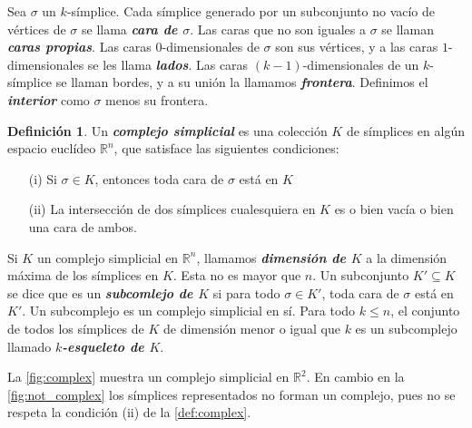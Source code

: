 \documentclass[10pt]{report}
\newcommand{\R}{\mathbb{R}}
\newcommand{\enfatiza}[1]{\textbf{\textit{#1}}}
\theoremstyle{definition}
\newtheorem{defin}{Definición}[section]
\begin{document}
Sea $\sigma$ un $k$-símplice. Cada símplice generado por un subconjunto no vacío de vértices de $\sigma$ se llama \enfatiza{cara de $\sigma$}. Las caras que no son iguales a $\sigma$ se llaman \enfatiza{caras propias}. Las caras $0$-dimensionales de $\sigma$ son sus vértices, y a las caras $1$-dimensionales se les llama \enfatiza{lados}. Las caras $(k-1)$-dimensionales de un $k$-símplice se llaman bordes, y a su unión la llamamos \enfatiza{frontera}. Definimos el \enfatiza{interior} como $\sigma$ menos su frontera. 


\begin{defin}%
Un \enfatiza{complejo simplicial} es una colección $K$ de símplices en algún espacio euclídeo $\R ^n$, que satisface las siguientes condiciones:
\begin{itemize}
\item[(i)] Si $\sigma \in K $, entonces toda cara de $\sigma$ está en $K$
\item[(ii)] La intersección de dos símplices cualesquiera en $K$ es o bien vacía o bien una cara de ambos.
\end{itemize}
\label{def:complex}
\end{defin}

Si $K$ un complejo simplicial en $\R ^n$, llamamos \enfatiza{dimensión de $K$} a la dimensión máxima de los símplices en $K$. Esta no es mayor que $n$.
Un subconjunto $K'\subseteq K$ se dice que es un \enfatiza{subcomlejo de $K$} si para todo $\sigma \in K'$, toda cara de $\sigma$ está en $K'$. Un subcomplejo es un complejo simplicial en sí.
Para todo $k\leq n$, el conjunto de todos los símplices de $K$ de dimensión menor o igual que $k$ es un subcomplejo llamado \enfatiza{$k$-esqueleto de $K$}.

La \autoref{fig:complex} muestra un complejo simplicial en $\R^2$. En cambio en la \autoref{fig:not_complex} los símplices representados no forman un complejo, pues no se respeta la condición (ii) de la \autoref{def:complex}.
\end{document}
